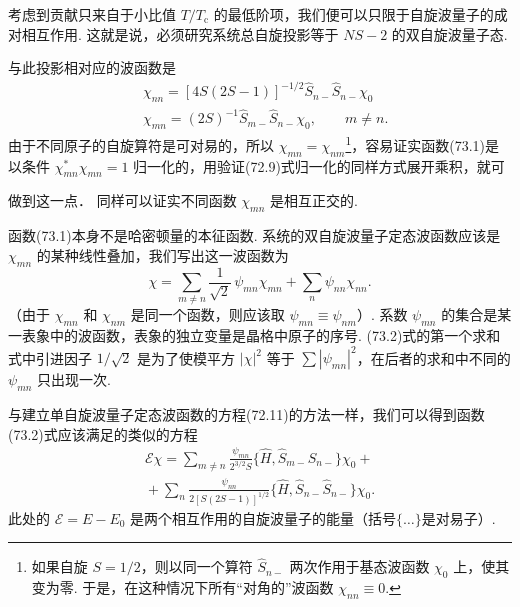 考虑到贡献只来自于小比值 $T/T_{\mathrm{c}}$ 的最低阶项，我们便可以只限于自旋波量子的成对相互作用. 这就是说，必须研究系统总自旋投影等于 $NS-2$ 的双自旋波量子态.

与此投影相对应的波函数是
\begin{equation}
\begin{aligned}
&\chi_{nn}=[4S(2S-1)]^{-1/2}\hat{S}_{n-}\hat{S}_{n-}\chi_0\\
&\chi_{mn}=(2S)^{-1}\hat{S}_{m-}\hat{S}_{n-}\chi_0,\qquad m\neq n.
\end{aligned}
\end{equation}
由于不同原子的自旋算符是可对易的，所以 $\chi_{mn}=\chi_{nm}$\footnote{如果自旋 $S=1/2$，则以同一个算符 $\hat{S}_{n-}$ 两次作用于基态波函数 $\chi_0$ 上，使其变为零. 于是，在这种情况下所有“对角的”波函数 $\chi_{nn}\equiv0$.}，容易证实函数(73.1)是以条件 $\chi_{mn}^{*}\chi_{mn}=1$ 归一化的，用验证(72.9)式归一化的同样方式展开乘积，就可

做到这一点． 同样可以证实不同函数 $\chi_{mn}$ 是相互正交的.

函数(73.1)本身不是哈密顿量的本征函数. 系统的双自旋波量子定态波函数应该是 $\chi_{mn}$ 的某种线性叠加，我们写出这一波函数为
\begin{equation}
\chi=\sum_{m\neq n}\frac{1}{\sqrt{2}}\,\psi_{mn}\chi_{mn}
+\sum_n\psi_{nn}\chi_{nn}.
\end{equation}
（由于 $\chi_{mn}$ 和 $\chi_{nm}$ 是同一个函数，则应该取 $\psi_{mn}\equiv\psi_{nm}$）. 系数 $\psi_{mn}$ 的集合是某一表象中的波函数，表象的独立变量是晶格中原子的序号. (73.2)式的第一个求和式中引进因子 $1/\sqrt{2}$ 是为了使模平方 $|\chi|^2$ 等于 $\sum|\psi_{mn}|^2$，在后者的求和中不同的 $\psi_{mn}$ 只出现一次.

与建立单自旋波量子定态波函数的方程(72.11)的方法一样，我们可以得到函数(73.2)式应该满足的类似的方程
\begin{equation}
\begin{aligned}
\mathcal{E}\chi=\sum_{m\neq n}\frac{\psi_{mn}}{2^{3/2}S}
\{\hat{H},\hat{S}_{m-}\hat{S}_{n-}\}\chi_0+{}\\
{}+\sum_n\frac{\psi_{nn}}{2[S(2S-1)]^{1/2}}
\{\hat{H},\hat{S}_{n-}\hat{S}_{n-}\}\chi_0.
\end{aligned}
\end{equation}
此处的 $\mathcal{E}=E-E_0$ 是两个相互作用的自旋波量子的能量（括号$\{\dots\}$是对易子）.

